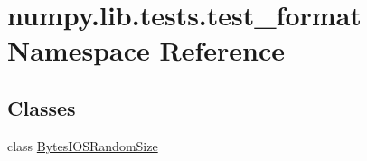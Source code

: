 \hypertarget{namespacenumpy_1_1lib_1_1tests_1_1test__format}{}\section{numpy.\+lib.\+tests.\+test\+\_\+format Namespace Reference}
\label{namespacenumpy_1_1lib_1_1tests_1_1test__format}
\subsection*{Classes}
\begin{DoxyCompactItemize}
\item 
class \hyperlink{classnumpy_1_1lib_1_1tests_1_1test__format_1_1BytesIOSRandomSize}{Bytes\+I\+O\+S\+Random\+Size}
\end{DoxyCompactItemize}
